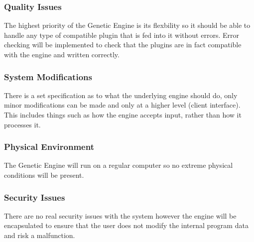 \subsubsection{Quality Issues}
The highest priority of the Genetic Engine is its flexbility so it should be able to handle any type of compatible plugin that is fed into it without errors. Error checking will be implemented to check that the plugins are in fact compatible with the engine and written correctly. 

\subsubsection{System Modifications}
There is a set specification as to what the underlying engine should do, only minor modifications can be made and only at a higher level (client interface). This includes things such as how the engine accepts input, rather than how it processes it.

\subsubsection{Physical Environment}
The Genetic Engine will run on a regular computer so no extreme physical conditions will be present.

\subsubsection{Security Issues}
There are no real security issues with the system however the engine will be encapsulated to ensure that the user does not modify the internal program data and risk a malfunction.

